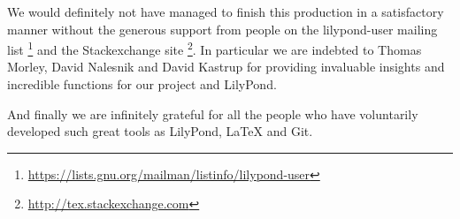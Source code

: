 \documentclass[11pt,a4paper]{article}
\begin{document}
We would definitely not have managed to finish this production in a satisfactory manner
without the generous support from people on the lilypond-user mailing list%
\footnote{\url{https://lists.gnu.org/mailman/listinfo/lilypond-user}}
and the Stackexchange site%
\footnote{\url{http://tex.stackexchange.com}}. In particular we are indebted to
Thomas Morley, David Nalesnik and David Kastrup for providing invaluable insights and
incredible functions for our project and LilyPond.

And finally we are infinitely grateful for all the people who have voluntarily developed
such great tools as LilyPond, \LaTeX{} and Git.
\end{document}

